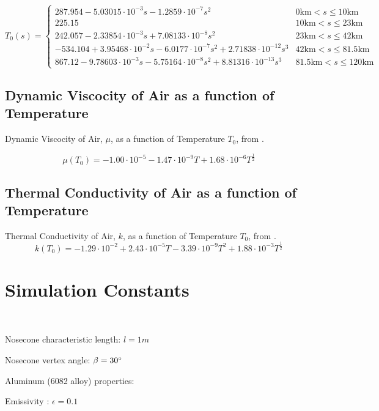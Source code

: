 \documentclass[twocolumn]{article}
\begin{document}
\begin{appendices}
                \[T_0(s)=\begin{cases}
                    287.954-5.03015\cdot10^{-3}s-1.2859\cdot10^{-7}s^2 & 0\textrm{km}<s\leq 10\textrm{km}\\
                    225.15 & 10\textrm{km}<s\leq 23\textrm{km}\\
                    242.057-2.33854\cdot10^{-3}s+7.08133\cdot10^{-8}s^2 & 23\textrm{km}<s\leq 42\textrm{km}\\
                    -534.104+3.95468\cdot10^{-2}s-6.0177\cdot10^{-7}s^2+2.71838\cdot10^{-12}s^3 & 42\textrm{km}<s\leq 81.5\textrm{km}\\
                    867.12-9.78603\cdot10^{-3}s-5.75164\cdot10^{-8}s^2+8.81316\cdot10^{-13}s^3 &  81.5\textrm{km}<s\leq 120\textrm{km}
                \end{cases}\]
            \subsection{Dynamic Viscocity of Air as a function of Temperature}
                Dynamic Viscocity of Air, $\mu$, as a function of Temperature $T_0$, from \cite{Hans:Aero}.
                
                \[\mu(T_0)=-1.00\cdot10^{-5}-1.47\cdot10^{-9}T+1.68\cdot10^{-6}T^{\frac{1}{2}}\]

            \subsection{Thermal Conductivity of Air as a function of Temperature}
                Thermal Conductivity of Air, $k$, as a function of Temperature $T_0$, from \cite{Hans:Aero}.
                \[k(T_0)=-1.29\cdot10^{-2}+2.43\cdot10^{-5}T-3.39\cdot10^{-9}T^2+1.88\cdot10^{-3}T^{\frac{1}{2}}\]

        \section{Simulation Constants}
        \label{appendix:b}
        \
    \end{appendices}

    Nosecone characteristic length:
    $l=1m$
    
    Nosecone vertex angle:
    $\beta=30\degree$

    Aluminum (6082 alloy) properties:
    
    \hspace{\parindent} Emissivity \cite{alum:emis}:
    $\epsilon = 0.1$
\end{document}
